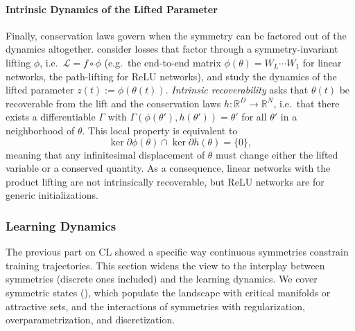 \documentclass[mathematics,review,submit,moreauthors]{Definitions/mdpi}
\begin{document}
\paragraph{Intrinsic Dynamics of the Lifted Parameter}
Finally, conservation laws govern when the symmetry can be factored out of the dynamics altogether.
\citet{marcotte2026} consider losses that factor through a symmetry-invariant lifting $\phi$, i.e.\ $\mathcal{L}=f\circ\phi$ (e.g.\ the end-to-end matrix $\phi(\theta)=W_L\cdots W_1$ for linear networks, the path-lifting for ReLU networks), and study the dynamics of the lifted parameter $z(t):=\phi(\theta(t))$.
\emph{Intrinsic recoverability} asks that $\theta(t)$ be recoverable from the lift and the conservation laws $h:\mathbb{R}^D\to\mathbb{R}^N$, i.e.\ that there exists a differentiable $\Gamma$ with $\Gamma(\phi(\theta'),h(\theta'))=\theta'$ for all $\theta'$ in a neighborhood of $\theta$.
This local property is equivalent to
\begin{equation*}
    \ker\partial\phi(\theta)\cap\ker\partial h(\theta)=\{0\},
\end{equation*}
meaning that any infinitesimal displacement of $\theta$ must change either the lifted variable or a conserved quantity.
As a consequence, linear networks with the product lifting are not intrinsically recoverable, but ReLU networks are for generic initializations.

\subsubsection{Learning Dynamics}\label{sec:learning-dynamics}
The previous part on CL showed a specific way continuous symmetries constrain training trajectories.
This section widens the view to the interplay between symmetries (discrete ones included) and the learning dynamics.
We cover symmetric states (), which populate the landscape with critical manifolds or attractive sets, and the interactions of symmetries with regularization, overparametrization, and discretization.
\end{document}
